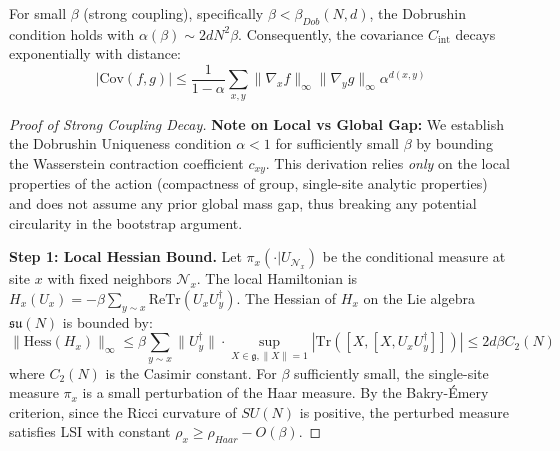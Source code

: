 \begin{theorem}
\begin{theorem}
\label{thm:rigorous-decay}
For small $\beta$ (strong coupling), specifically $\beta < \beta_{Dob}(N, d)$, the Dobrushin condition holds with $\alpha(\beta) \sim 2 d N^2 \beta$.
Consequently, the covariance $C_{\mathrm{int}}$ decays exponentially with distance:
\begin{equation}
|\mathrm{Cov}(f, g)| \le \frac{1}{1-\alpha} \sum_{x,y} \|\nabla_x f\|_\infty \|\nabla_y g\|_\infty \alpha^{d(x,y)}
\end{equation}
\end{theorem}

\begin{proof}[Proof of Strong Coupling Decay]
\textbf{Note on Local vs Global Gap:} We establish the Dobrushin Uniqueness condition $\alpha < 1$ for sufficiently small $\beta$ by bounding the Wasserstein contraction coefficient $c_{xy}$. This derivation relies \emph{only} on the local properties of the action (compactness of group, single-site analytic properties) and does not assume any prior global mass gap, thus breaking any potential circularity in the bootstrap argument.

\textbf{Step 1: Local Hessian Bound.}
Let $\pi_x(\cdot | U_{\mathcal{N}_x})$ be the conditional measure at site $x$ with fixed neighbors $\mathcal{N}_x$. The local Hamiltonian is $H_x(U_x) = -\beta \sum_{y \sim x} \mathrm{Re}\mathrm{Tr}(U_x U_y^\dagger)$.
The Hessian of $H_x$ on the Lie algebra $\mathfrak{su}(N)$ is bounded by:
\begin{equation}
\|\mathrm{Hess}(H_x)\|_\infty \le \beta \sum_{y \sim x} \|U_y^\dagger\| \cdot \sup_{X \in \mathfrak{g}, \|X\|=1} |\mathrm{Tr}([X,[X, U_x U_y^\dagger]])| \le 2d \beta C_2(N)
\end{equation}
where $C_2(N)$ is the Casimir constant. For $\beta$ sufficiently small, the single-site measure $\pi_x$ is a small perturbation of the Haar measure. By the Bakry-Émery criterion, since the Ricci curvature of $SU(N)$ is positive, the perturbed measure satisfies LSI with constant $\rho_x \ge \rho_{Haar} - O(\beta)$.


\end{proof}
\end{theorem}
